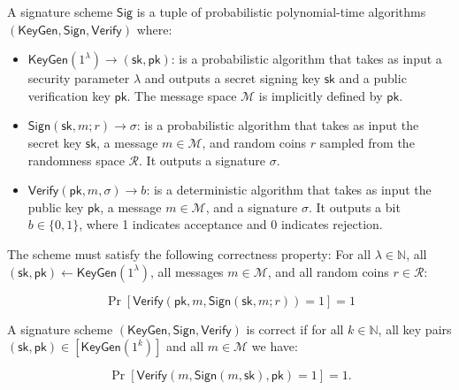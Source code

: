 \begin{definition}
A signature scheme $\mathsf{Sig}$ is a tuple of probabilistic polynomial-time algorithms $(\mathsf{KeyGen}, \mathsf{Sign}, \mathsf{Verify})$ where:

\begin{itemize}
    \item $\mathsf{KeyGen}(1^\lambda) \rightarrow (\mathsf{sk}, \mathsf{pk})$: is a probabilistic algorithm that takes as input a security parameter $\lambda$ and outputs a secret signing key $\mathsf{sk}$ and a public verification key $\mathsf{pk}$. The message space $\mathcal{M}$ is implicitly defined by $\mathsf{pk}$.
    
    \item $\mathsf{Sign}(\mathsf{sk}, m; r) \rightarrow \sigma$: is a probabilistic algorithm that takes as input the secret key $\mathsf{sk}$, a message $m \in \mathcal{M}$, and random coins $r$ sampled from the randomness space $\mathcal{R}$. It outputs a signature $\sigma$.
    
    \item $\mathsf{Verify}(\mathsf{pk}, m, \sigma) \rightarrow b$: is a deterministic algorithm that takes as input the public key $\mathsf{pk}$, a message $m \in \mathcal{M}$, and a signature $\sigma$. It outputs a bit $b \in \{0,1\}$, where 1 indicates acceptance and 0 indicates rejection.
\end{itemize}

The scheme must satisfy the following correctness property:
For all $\lambda \in \mathbb{N}$, all $(\mathsf{sk}, \mathsf{pk}) \leftarrow \mathsf{KeyGen}(1^\lambda)$, all messages $m \in \mathcal{M}$, and all random coins $r \in \mathcal{R}$:

$$\Pr[\mathsf{Verify}(\mathsf{pk}, m, \mathsf{Sign}(\mathsf{sk}, m; r)) = 1] = 1$$

\end{definition}

\begin{definition}[Correctness]
A signature scheme $(\mathsf{KeyGen}, \mathsf{Sign}, \mathsf{Verify})$ is correct if for all $k \in \mathbb{N}$, all key pairs $(\mathsf{sk}, \mathsf{pk}) \in [\mathsf{KeyGen}(1^k)]$ and all $m \in \mathcal{M}$ we have:

$$\Pr[\mathsf{Verify}(m, \mathsf{Sign}(m, \mathsf{sk}), \mathsf{pk}) = 1] = 1.$$
\end{definition}

